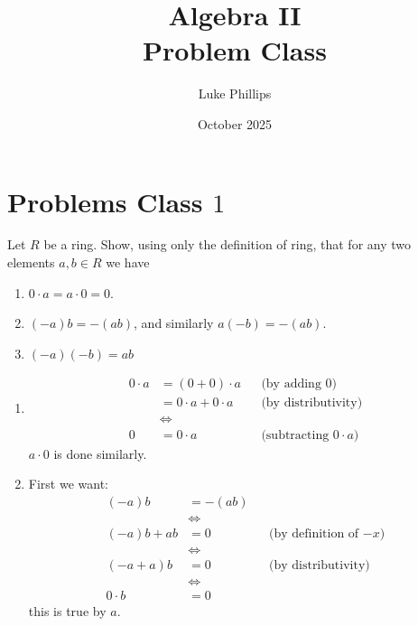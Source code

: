 \documentclass[10pt, a4paper]{article}
\title{Algebra II \\
    \large Problem Class}
\author{Luke Phillips}
\date{October 2025}
\begin{document}
\maketitle

\newpage

\tableofcontents

\newpage

\section{Problems Class \texorpdfstring{$1$}{}}

\begin{problem}[Question $2$]
    Let $R$ be a ring.
    Show,
    using only the definition of ring,
    that for any two elements $a, b \in R$ we have
    \begin{enumerate}[label = (\alph*)]
        \item $0 \cdot a = a \cdot 0 = 0$.

        \item $(-a)b = -(ab)$,
        and similarly $a(-b) = -(ab)$.

        \item $(-a)(-b) = ab$
    \end{enumerate}

    \begin{solution}
        \begin{enumerate}[label = (\alph*)]
            \item
            \begin{align*}
                0 \cdot a &= (0 + 0) \cdot a &&\text{(by adding $0$}) \\
                &= 0 \cdot a + 0 \cdot a &&\text{(by distributivity)} \\
                &\iff \\
                0 &= 0 \cdot a &&\text{(subtracting $0 \cdot a$)}
            \end{align*}
            $a \cdot 0$ is done similarly.

            \item
            First we want:
            \begin{align*}
                (-a)b &= -(ab) \\
                &\iff \\
                (-a)b + ab &= 0 &&\text{(by definition of $-x$)} \\
                &\iff \\
                (-a + a)b &= 0  &&\text{(by distributivity)} \\
                &\iff \\
                0 \cdot b &= 0
            \end{align*}
            this is true by $a$.


\end{enumerate}
\end{solution}
\end{problem}
\end{document}
